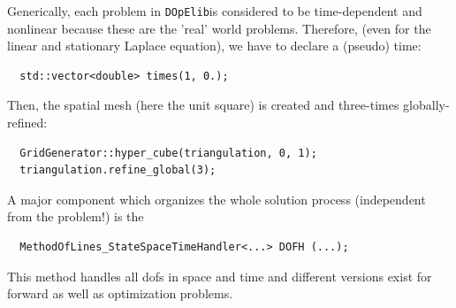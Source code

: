 \documentclass[prodmode,acmtoms]{acmsmall}
\numberwithin{equation}{section}
\newcommand{\dope}{\texttt{DOpElib}}
\begin{document}
Generically, each problem in \dope is considered to be time-dependent and nonlinear because
these are the 'real' world problems. Therefore, (even for the linear and stationary Laplace equation),
we have to declare a (pseudo) time:
\begin{lstlisting}
  std::vector<double> times(1, 0.);
\end{lstlisting}
Then, the spatial mesh (here the unit square) is created and three-times globally-refined:
\begin{lstlisting}
  GridGenerator::hyper_cube(triangulation, 0, 1);
  triangulation.refine_global(3);
\end{lstlisting}
A major component which organizes the whole solution process (independent from 
the problem!) is the 
\begin{lstlisting}
  MethodOfLines_StateSpaceTimeHandler<...> DOFH (...);
\end{lstlisting}
This method handles all dofs in space and time and different versions exist
for forward as well as optimization problems.
\end{document}
